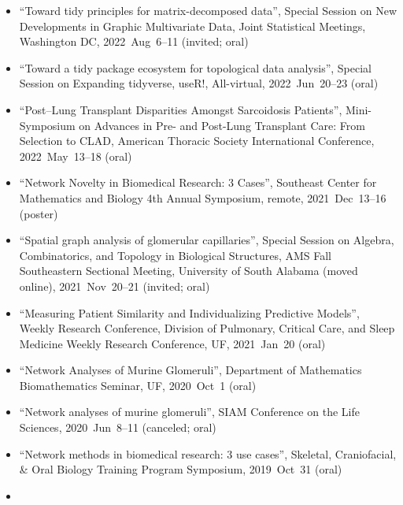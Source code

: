 \documentclass[10pt,a4paper]{article}
\begin{document}
\begin{itemize}[label=$\circ$,nolistsep]
\item
``Toward tidy principles for matrix-decomposed data'', Special Session on New Developments in Graphic Multivariate Data, Joint Statistical Meetings, Washington DC, 2022~Aug~6--11 (invited; oral)
\item
``Toward a tidy package ecosystem for topological data analysis'', Special Session on Expanding {\sffamily tidyverse}, useR!, All-virtual, 2022~Jun~20--23 (oral)
\item
``Post--Lung Transplant Disparities Amongst Sarcoidosis Patients'', Mini-Symposium on Advances in Pre- and Post-Lung Transplant Care: From Selection to CLAD, American Thoracic Society International Conference, 2022~May~13--18 (oral)
\item
``Network Novelty in Biomedical Research: 3 Cases'', Southeast Center for Mathematics and Biology 4th Annual Symposium, remote, 2021~Dec~13--16 (poster)
\item
``Spatial graph analysis of glomerular capillaries'', Special Session on Algebra, Combinatorics, and Topology in Biological Structures, AMS Fall Southeastern Sectional Meeting, University of South Alabama (moved online), 2021~Nov~20--21 (invited; oral)
\item
``Measuring Patient Similarity and Individualizing Predictive Models'', Weekly Research Conference, Division of Pulmonary, Critical Care, and Sleep Medicine Weekly Research Conference, UF, 2021~Jan~20 (oral)
\item
``Network Analyses of Murine Glomeruli'', Department of Mathematics Biomathematics Seminar, UF, 2020~Oct~1 (oral)
\item
``Network analyses of murine glomeruli'', SIAM Conference on the Life Sciences, 2020~Jun~8--11 (canceled; oral)
\item
``Network methods in biomedical research: 3 use cases'', Skeletal, Craniofacial, \& Oral Biology Training Program Symposium, 2019~Oct~31 (oral)
\item

\end{itemize}
\end{document}
